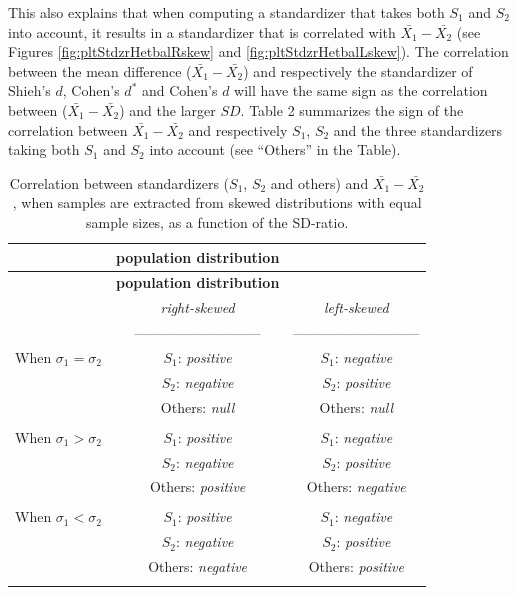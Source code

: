 \documentclass[
  english,
  man,mask]{apa6}
\begin{document}
This also explains that when computing a standardizer that takes both \(S_1\) and \(S_2\) into account, it results in a standardizer that is correlated with \(\bar{X_1}-\bar{X_2}\) (see Figures \ref{fig:pltStdzrHetbalRskew} and \ref{fig:pltStdzrHetbalLskew}). The correlation between the mean difference (\(\bar{X_1}-\bar{X_2}\)) and respectively the standardizer of Shieh's \(d\), Cohen's \(d^*\) and Cohen's \(d\) will have the same sign as the correlation between (\(\bar{X_1}-\bar{X_2}\)) and the larger \(SD\). Table 2 summarizes the sign of the correlation between \(\bar{X_1}-\bar{X_2}\) and respectively \(S_1\), \(S_2\) and the three standardizers taking both \(S_1\) and \(S_2\) into account (see ``Others'' in the Table).

\begin{longtable}[]{@{}lcc@{}}
\caption{Correlation between standardizers (\(S_1\), \(S_2\) and others) and \(\bar{X_1}-\bar{X_2}\), when samples are extracted from skewed distributions with equal sample sizes, as a function of the SD-ratio.}\tabularnewline
\toprule
& \textbf{\textbf{population distribution}} & \\
\midrule
\endfirsthead
\toprule
& \textbf{\textbf{population distribution}} & \\
\midrule
\endhead
& \emph{right-skewed} & \emph{left-skewed} \\
& --------------------------- & --------------------------- \\
When \(\sigma_1=\sigma_2\) & \(S_1\): \emph{positive} & \(S_1\): \emph{negative} \\
& \(S_2\): \emph{negative} & \(S_2\): \emph{positive} \\
& Others: \emph{null} & Others: \emph{null} \\
& & \\
When \(\sigma_1>\sigma_2\) & \(S_1\): \emph{positive} & \(S_1\): \emph{negative} \\
& \(S_2\): \emph{negative} & \(S_2\): \emph{positive} \\
& Others: \emph{positive} & Others: \emph{negative} \\
& & \\
When \(\sigma_1<\sigma_2\) & \(S_1\): \emph{positive} & \(S_1\): \emph{negative} \\
& \(S_2\): \emph{negative} & \(S_2\): \emph{positive} \\
& Others: \emph{negative} & Others: \emph{positive} \\
& & \\
\bottomrule
\end{longtable}
\end{document}
